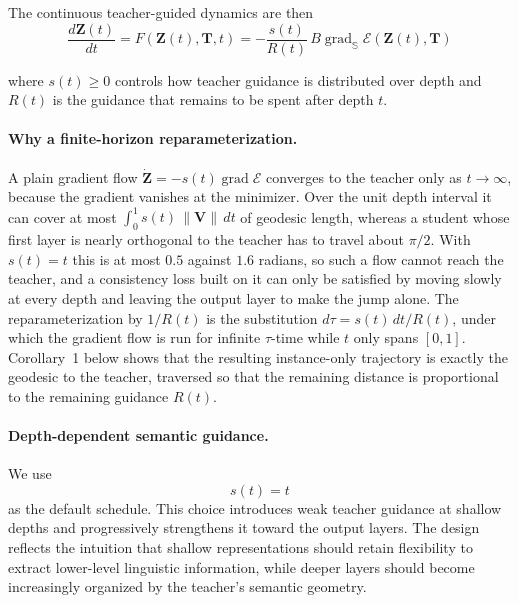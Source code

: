 \documentclass[11pt]{article}
\begin{document}
The continuous teacher-guided dynamics are then
\begin{equation}
    \boxed{
    \frac{d\mathbf{Z}(t)}{dt}
    =
    F(\mathbf{Z}(t),\mathbf{T},t)
    =
    -
    \frac{s(t)}{R(t)}
    \,B\operatorname{grad}_{\mathbb{S}}
    \mathcal{E}
    \left(
        \mathbf{Z}(t),\mathbf{T}
    \right)
    }
    \label{eq:geoode}
\end{equation}

where $s(t)\ge0$ controls how teacher guidance is distributed over depth
and $R(t)$ is the guidance that remains to be spent after depth $t$.

\paragraph{Why a finite-horizon reparameterization.}
A plain gradient flow $\dot{\mathbf{Z}}=-s(t)\operatorname{grad}\mathcal{E}$
converges to the teacher only as $t\to\infty$, because the gradient
vanishes at the minimizer. Over the unit depth interval it can cover at most
$\int_0^1 s(t)\,\|\mathbf{V}\|\,dt$ of geodesic length, whereas a student
whose first layer is nearly orthogonal to the teacher has to travel about
$\pi/2$. With $s(t)=t$ this is at most $0.5$ against $1.6$ radians, so such
a flow cannot reach the teacher, and a consistency loss built on it can only
be satisfied by moving slowly at every depth and leaving the output layer to
make the jump alone. The reparameterization by $1/R(t)$ is the
substitution $d\tau=s(t)\,dt/R(t)$, under which the gradient flow is run
for infinite $\tau$-time while $t$ only spans $[0,1]$. Corollary~1 below
shows that the resulting instance-only trajectory is exactly the geodesic
to the teacher, traversed so that the remaining distance is proportional to
the remaining guidance $R(t)$.

\paragraph{Depth-dependent semantic guidance.}

We use
\begin{equation}
    s(t)=t
    \label{eq:schedule}
\end{equation}
as the default schedule.
This choice introduces weak teacher guidance at shallow depths and
progressively strengthens it toward the output layers. The design reflects
the intuition that shallow representations should retain flexibility to
extract lower-level linguistic information, while deeper layers should
become increasingly organized by the teacher's semantic geometry.
\end{document}
